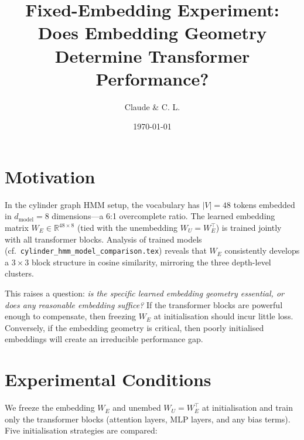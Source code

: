 \documentclass[11pt]{article}
\title{Fixed-Embedding Experiment: Does Embedding Geometry\\
       Determine Transformer Performance?}
\author{Claude \& C. L.}
\date{\today}
\begin{document}
\maketitle

\section{Motivation}

In the cylinder graph HMM setup, the vocabulary has $|V| = 48$ tokens
embedded in $d_{\mathrm{model}} = 8$ dimensions---a 6:1 overcomplete
ratio.  The learned embedding matrix $W_E \in \mathbb{R}^{48 \times 8}$
(tied with the unembedding $W_U = W_E^\top$) is trained jointly with all
transformer blocks.  Analysis of trained models
(cf.\ \texttt{cylinder\_hmm\_model\_comparison.tex}) reveals that $W_E$
consistently develops a $3 \times 3$ block structure in cosine
similarity, mirroring the three depth-level clusters.

This raises a question: \emph{is the specific learned embedding geometry
essential, or does any reasonable embedding suffice?}  If the
transformer blocks are powerful enough to compensate, then freezing $W_E$
at initialisation should incur little loss.  Conversely, if the
embedding geometry is critical, then poorly initialised embeddings will
create an irreducible performance gap.

\section{Experimental Conditions}

We freeze the embedding $W_E$ and unembed $W_U = W_E^\top$ at
initialisation and train only the transformer blocks (attention layers,
MLP layers, and any bias terms).  Five initialisation strategies are
compared:
\end{document}
